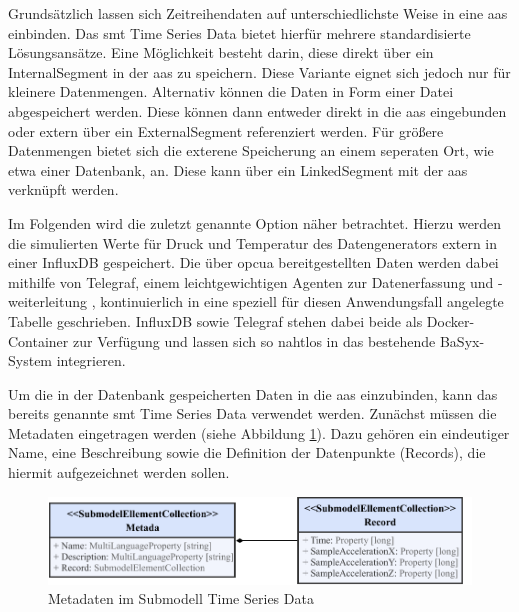 Grundsätzlich lassen sich Zeitreihendaten auf unterschiedlichste Weise in eine \acs{aas} einbinden.
Das \acs{smt} Time Series Data \cite{SpezifikationTimeSeriesData} bietet hierfür mehrere standardisierte Lösungsansätze.
Eine Möglichkeit besteht darin, diese direkt über ein InternalSegment in der \acs{aas} zu speichern.
Diese Variante eignet sich jedoch nur für kleinere Datenmengen.
Alternativ können die Daten in Form einer Datei abgespeichert werden.
Diese können dann entweder direkt in die \acs{aas} eingebunden oder extern über ein ExternalSegment referenziert werden.
Für größere Datenmengen bietet sich die exterene Speicherung an einem seperaten Ort, wie etwa einer Datenbank, an.
Diese kann über ein LinkedSegment mit der \acs{aas} verknüpft werden.

Im Folgenden wird die zuletzt genannte Option näher betrachtet.
Hierzu werden die simulierten Werte für Druck und Temperatur des Datengenerators extern in einer InfluxDB gespeichert.
Die über \acs{opcua} bereitgestellten Daten werden dabei mithilfe von Telegraf, einem leichtgewichtigen Agenten zur Datenerfassung und -weiterleitung \cite{Influx}, kontinuierlich in eine speziell für diesen Anwendungsfall angelegte Tabelle geschrieben.
InfluxDB sowie Telegraf stehen dabei beide als Docker-Container zur Verfügung und lassen sich so nahtlos in das bestehende BaSyx-System integrieren.

Um die in der Datenbank gespeicherten Daten in die \acs{aas} einzubinden, kann das bereits genannte \acs{smt} Time Series Data verwendet werden.
Zunächst müssen die Metadaten eingetragen werden (siehe Abbildung \ref{fig:MetadataTimeSeries}).
Dazu gehören ein eindeutiger Name, eine Beschreibung sowie die Definition der Datenpunkte (Records), die hiermit aufgezeichnet werden sollen.

\begin{figure}[htbp]
    \centering
    \includegraphics[width=1\textwidth]{Bilder/TimeSeries/Metadaten.pdf}
    \caption{Metadaten im Submodell Time Series Data}
    \label{fig:MetadataTimeSeries}
\end{figure}

